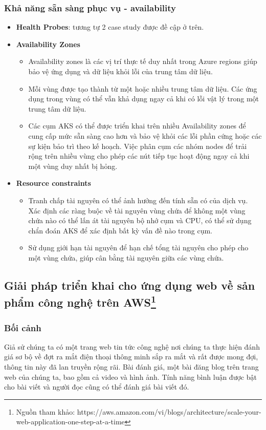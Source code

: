 \subsubsection{Khả năng sẵn sàng phục vụ - availability}
    \begin{itemize}
        \item \textbf{Health Probes}: tương tự 2 case study được đề cập ở trên.
        \item \textbf{Availability Zones}
            \begin{itemize}
                \item Availability zones là các vị trí thực tế duy nhất trong  Azure regions giúp bảo vệ ứng dụng và dữ liệu khỏi lỗi của trung tâm dữ liệu. 
                \item Mỗi vùng được tạo thành từ một hoặc nhiều trung tâm dữ liệu. Các ứng dụng trong vùng có thể vẫn khả dụng ngay cả khi có lỗi vật lý trong một trung tâm dữ liệu. 
                \item Các cụm AKS có thể được triển khai trên nhiều Availability zones để cung cấp mức sẵn sàng cao hơn và bảo vệ khỏi các lỗi phần cứng hoặc các sự kiện bảo trì theo kế hoạch. Việc phân cụm các nhóm nodes để trải rộng trên nhiều vùng cho phép các nút tiếp tục hoạt động ngay cả khi một vùng duy nhất bị hỏng.  
            \end{itemize}
        \item \textbf{Resource constraints}
            \begin{itemize}
                \item Tranh chấp tài nguyên có thể ảnh hưởng đến tính sẵn có của dịch vụ. Xác định các ràng buộc về tài nguyên vùng chứa để không một vùng chứa nào có thể lấn át tài nguyên bộ nhớ cụm và CPU, có thể sử dụng chẩn đoán AKS để xác định bất kỳ vấn đề nào trong cụm.
                \item Sử dụng giới hạn tài nguyên để hạn chế tổng tài nguyên cho phép cho một vùng chứa, giúp cân bằng tài nguyên giữa các vùng chứa. 
            \end{itemize}
    \end{itemize}
\subsection{Giải pháp triển khai cho ứng dụng web về sản phẩm công nghệ trên AWS\protect\footnote{Nguồn tham khảo: https://aws.amazon.com/vi/blogs/architecture/scale-your-web-application-one-step-at-a-time}}
\subsubsection{Bối cảnh}
Giả sử chúng ta có một trang web tin tức công nghệ nơi chúng ta thực hiện đánh giá sơ bộ về đợt ra mắt điện thoại thông minh sắp ra mắt và rất được mong đợi, thông tin này đã lan truyền rộng rãi. Bài đánh giá, một bài đăng blog trên trang web của chúng ta, bao gồm cả video và hình ảnh. Tính năng bình luận được bật cho bài viết và người đọc cũng có thể đánh giá bài viết đó. 
